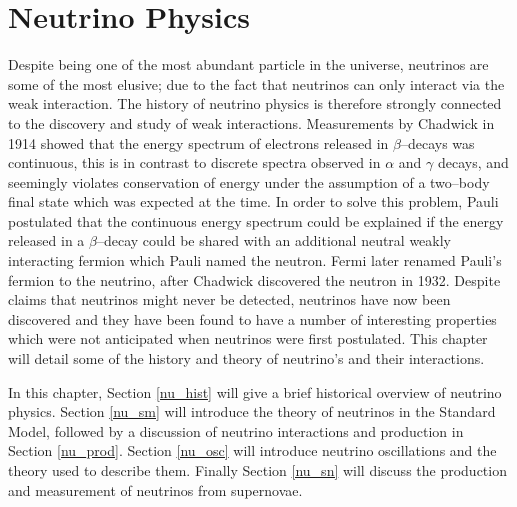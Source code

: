 \chapter{\label{ch:2-neutrinophysics}Neutrino Physics} 


 

\minitoc

Despite being one of the most abundant particle in the universe, neutrinos are 
some of the most elusive; due to the fact that neutrinos can only interact via
the weak interaction. The history of neutrino physics is therefore strongly
connected to the discovery and study of weak interactions. Measurements by
Chadwick in 1914 showed that the energy spectrum of electrons released in
\(\beta\)--decays was continuous, this is in contrast to discrete spectra
observed in \(\alpha\) and \(\gamma\) decays, and seemingly violates
conservation of energy under the assumption of a two--body final state which was
expected at the time. In order to solve this problem, Pauli postulated that the 
continuous energy spectrum could be explained if the energy released in a 
\(\beta\)--decay could be shared with an additional neutral weakly interacting 
fermion which Pauli named the neutron. Fermi later renamed Pauli's fermion to 
the neutrino, after Chadwick discovered the neutron in 1932. Despite claims that 
neutrinos might never be detected, neutrinos have now been discovered and they 
have been found to have a number of interesting properties which were not 
anticipated when neutrinos were first postulated. This chapter will detail 
some of the history and theory of neutrino's and their interactions.

In this chapter, Section \ref{nu_hist} will give a brief historical overview of 
neutrino physics. Section \ref{nu_sm} will introduce the theory of neutrinos in
the Standard Model, followed by a discussion of neutrino interactions and
production in Section \ref{nu_prod}. Section \ref{nu_osc} will introduce 
neutrino oscillations and the theory used to describe them. Finally Section
\ref{nu_sn} will discuss the production and measurement of neutrinos from
supernovae.

